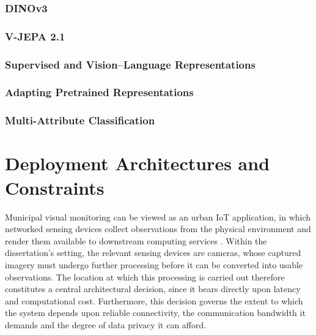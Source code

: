     \subsubsection{DINOv3}
    \label{sec:bg-dinov3}

    \subsubsection{V-JEPA 2.1}
    \label{sec:bg-vjepa}

    \subsubsection{Supervised and Vision--Language Representations}
    \label{sec:bg-representation-baselines}

    \subsubsection{Adapting Pretrained Representations}
    \label{sec:bg-transfer-strategies}

    \subsubsection{Multi-Attribute Classification}
    \label{sec:bg-multiattribute}

\newpage
\section{Deployment Architectures and Constraints}
\label{sec:bg-deployment}
Municipal visual monitoring can be viewed as an urban \gls{IoT} application, in which networked sensing devices collect observations from the physical environment and render them available to downstream computing services \cite{atzori2010iot,zanella2014iot}. Within the dissertation's setting, the relevant sensing devices are cameras, whose captured imagery must undergo further processing before it can be converted into usable observations. The location at which this processing is carried out therefore constitutes a central architectural decision, since it bears directly upon latency and computational cost. Furthermore, this decision governs the extent to which the system depends upon reliable connectivity, the communication bandwidth it demands and the degree of data privacy it can afford.

